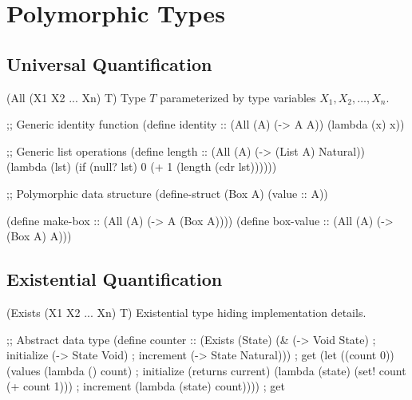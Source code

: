 \section{Polymorphic Types}  
\label{sec:polymorphic}


\subsection{Universal Quantification}
\label{subsec:universal}

\begin{typespec}{(All (X1 X2 ... Xn) T)}
Type $T$ parameterized by type variables $X_1, X_2, \ldots, X_n$.
\end{typespec}

\begin{example}
\begin{lambdustcode}
;; Generic identity function
(define identity :: (All (A) (-> A A))
  (lambda (x) x))

;; Generic list operations
(define length :: (All (A) (-> (List A) Natural))
  (lambda (lst)
    (if (null? lst) 0 (+ 1 (length (cdr lst))))))

;; Polymorphic data structure
(define-struct (Box A) (value :: A))

(define make-box :: (All (A) (-> A (Box A))))
(define box-value :: (All (A) (-> (Box A) A)))
\end{lambdustcode}
\end{example}

\subsection{Existential Quantification}
\label{subsec:existential}

\begin{typespec}{(Exists (X1 X2 ... Xn) T)}
Existential type hiding implementation details.
\end{typespec}

\begin{example}
\begin{lambdustcode}
;; Abstract data type
(define counter :: (Exists (State) 
                    (& (-> Void State)           ; initialize
                       (-> State Void)           ; increment  
                       (-> State Natural)))      ; get
  (let ((count 0))
    (values
      (lambda () count)                          ; initialize (returns current)
      (lambda (state) (set! count (+ count 1))) ; increment
      (lambda (state) count))))                  ; get
\end{lambdustcode}
\end{example}

